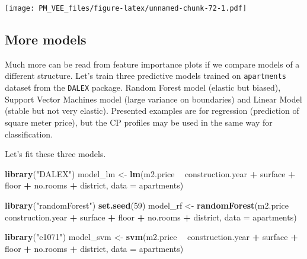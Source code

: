 \documentclass[12pt,]{krantz}
\newenvironment{Shaded}{\begin{snugshade}}{\end{snugshade}}
\newcommand{\DataTypeTok}[1]{\textcolor[rgb]{0.13,0.29,0.53}{#1}}
\newcommand{\DecValTok}[1]{\textcolor[rgb]{0.00,0.00,0.81}{#1}}
\newcommand{\KeywordTok}[1]{\textcolor[rgb]{0.13,0.29,0.53}{\textbf{#1}}}
\newcommand{\NormalTok}[1]{#1}
\newcommand{\OperatorTok}[1]{\textcolor[rgb]{0.81,0.36,0.00}{\textbf{#1}}}
\newcommand{\StringTok}[1]{\textcolor[rgb]{0.31,0.60,0.02}{#1}}
\theoremstyle{definition}
\theoremstyle{definition}
\theoremstyle{definition}
\theoremstyle{remark}
\begin{document}
\texttt{[image: PM\_VEE\_files/figure-latex/unnamed-chunk-72-1.pdf]}

\hypertarget{more-models}{%
\subsection{More models}\label{more-models}}

Much more can be read from feature importance plots if we compare models
of a different structure. Let's train three predictive models trained on
\texttt{apartments} dataset from the \texttt{DALEX} package. Random
Forest model \citep{R-randomForest} (elastic but biased), Support Vector
Machines model \citep{R-e1071} (large variance on boundaries) and Linear
Model (stable but not very elastic). Presented examples are for
regression (prediction of square meter price), but the CP profiles may
be used in the same way for classification.

Let's fit these three models.

\begin{Shaded}
\begin{Highlighting}[]
\KeywordTok{library}\NormalTok{(}\StringTok{"DALEX"}\NormalTok{)}
\NormalTok{model_lm <-}\StringTok{ }\KeywordTok{lm}\NormalTok{(m2.price }\OperatorTok{~}\StringTok{ }\NormalTok{construction.year }\OperatorTok{+}\StringTok{ }\NormalTok{surface }\OperatorTok{+}\StringTok{ }\NormalTok{floor }\OperatorTok{+}\StringTok{ }
\StringTok{                      }\NormalTok{no.rooms }\OperatorTok{+}\StringTok{ }\NormalTok{district, }\DataTypeTok{data =}\NormalTok{ apartments)}

\KeywordTok{library}\NormalTok{(}\StringTok{"randomForest"}\NormalTok{)}
\KeywordTok{set.seed}\NormalTok{(}\DecValTok{59}\NormalTok{)}
\NormalTok{model_rf <-}\StringTok{ }\KeywordTok{randomForest}\NormalTok{(m2.price }\OperatorTok{~}\StringTok{ }\NormalTok{construction.year }\OperatorTok{+}\StringTok{ }\NormalTok{surface }\OperatorTok{+}\StringTok{ }\NormalTok{floor }\OperatorTok{+}\StringTok{ }
\StringTok{                      }\NormalTok{no.rooms }\OperatorTok{+}\StringTok{ }\NormalTok{district, }\DataTypeTok{data =}\NormalTok{ apartments)}

\KeywordTok{library}\NormalTok{(}\StringTok{"e1071"}\NormalTok{)}
\NormalTok{model_svm <-}\StringTok{ }\KeywordTok{svm}\NormalTok{(m2.price }\OperatorTok{~}\StringTok{ }\NormalTok{construction.year }\OperatorTok{+}\StringTok{ }\NormalTok{surface }\OperatorTok{+}\StringTok{ }\NormalTok{floor }\OperatorTok{+}\StringTok{ }
\StringTok{                         }\NormalTok{no.rooms }\OperatorTok{+}\StringTok{ }\NormalTok{district, }\DataTypeTok{data =}\NormalTok{ apartments)}
\end{Highlighting}
\end{Shaded}
\end{document}
